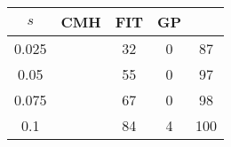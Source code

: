 \centering \begin{tabular}{c|c|c|c|c}
$s$	&CMH	&FIT	&GP	&\sc{Clear}\\\hline
0.025	&	&32	&0	&87\\
0.05	&	&55	&0	&97\\
0.075	&	&67	&0	&98\\
0.1	&	&84	&4	&100\\
\end{tabular}
